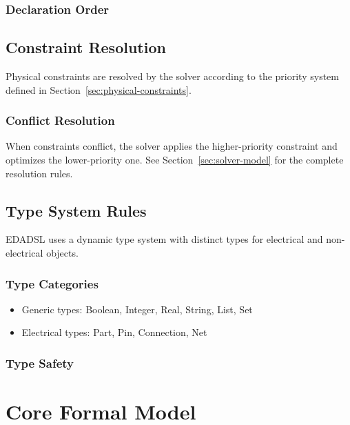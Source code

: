 \documentclass{report}
\begin{document}
\section{Declaration Order}


\chapter{Constraint Resolution}
Physical constraints are resolved by the solver according to the priority system defined in Section~\ref{sec:physical-constraints}.

\section{Conflict Resolution}
When constraints conflict, the solver applies the higher-priority constraint and optimizes the lower-priority one. See Section~\ref{sec:solver-model} for the complete resolution rules.


\chapter{Type System Rules}
EDADSL uses a dynamic type system with distinct types for electrical and non-electrical objects.

\section{Type Categories}
\begin{itemize}
\item Generic types: Boolean, Integer, Real, String, List, Set
\item Electrical types: Part, Pin, Connection, Net
\end{itemize}

\section{Type Safety}




\part{Core Formal Model}
\end{document}
